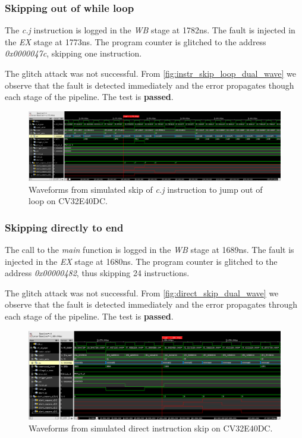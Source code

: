 \subsubsection{Skipping out of while loop}

The \textit{c.j} instruction is logged in the \textit{WB} stage at 1782ns. The fault is injected in the \textit{EX} stage at 1773ns. The program counter is glitched to the address \textit{0x0000047c}, skipping one instruction.

The glitch attack was not successful. From \autoref{fig:instr_skip_loop_dual_wave} we observe that the fault is detected immediately and the error propagates though each stage of the pipeline. The test is \textbf{passed}.

\begin{figure}[h!]
    \centering
    \includegraphics[width=\textwidth]{docs/images/instr_skip_loop_dual_core.png}
    \caption{Waveforms from simulated skip of \textit{c.j} instruction to jump out of loop on CV32E40DC.}
    \label{fig:instr_skip_loop_dual_wave}
\end{figure}

\subsubsection{Skipping directly to end}

The call to the \textit{main} function is logged in the \textit{WB} stage at 1689ns. The fault is injected in the \textit{EX} stage at 1680ns. The program counter is glitched to the address \textit{0x00000482}, thus skipping 24 instructions.

The glitch attack was not successful. From \autoref{fig:direct_skip_dual_wave} we observe that the fault is detected immediately and the error propagates through each stage of the pipeline. The test is \textbf{passed}.

\begin{figure}[h!]
    \centering
    \includegraphics[width=\textwidth]{docs/images/direct_skip_dual_core.png}
    \caption{Waveforms from simulated direct instruction skip on CV32E40DC.}
    \label{fig:direct_skip_dual_wave}
\end{figure}


